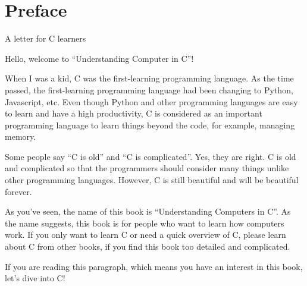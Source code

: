 \chapter*{Preface}

A letter for C learners

\clearpage

Hello, welcome to ``Understanding Computer in C''!

When I was a kid, C was the first-learning programming language. As the
time passed, the first-learning programming language had been changing to
Python, Javascript, etc. Even though Python and other programming
languages are easy to learn and have a high productivity, C is considered
as an important programming language to learn things beyond the code, for
example, managing memory.

Some people say ``C is old'' and ``C is complicated''. Yes, they are
right. C is old and complicated so that the programmers should consider
many things unlike other programming languages. However, C is still
beautiful and will be beautiful forever.

As you've seen, the name of this book is ``Understanding Computers in C''.
As the name suggests, this book is for people who want to learn how
computers work. If you only want to learn C or need a quick overview of C,
please learn about C from other books, if you find this book too
detailed and complicated.

If you are reading this paragraph, which means you have an interest in
this book, let's dive into C!

\clearpage
